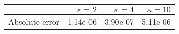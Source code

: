 \begin{tabular}{lrrr}
\toprule
 & $\kappa = 2$ & $\kappa = 4$ & $\kappa = 10$ \\
\midrule
Absolute error & 1.14e-06 & 3.90e-07 & 5.11e-06 \\
\bottomrule
\end{tabular}
